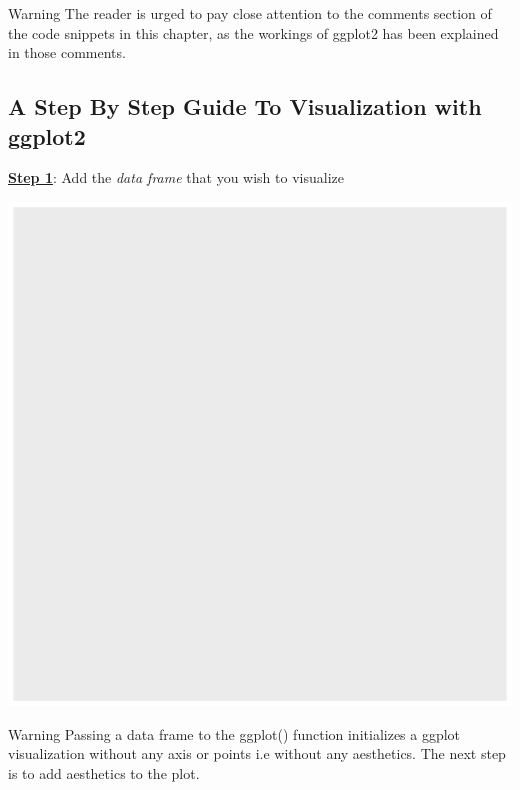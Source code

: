 \documentclass[12pt]{book}\usepackage{knitr}
\begin{document}
\begin{DIY}{Warning}
\noindent The reader is urged to pay close attention to the comments section of the code snippets in this chapter, as the workings of ggplot2 has been explained in those comments.
\end{DIY}



\newpage
\subsection{A Step By Step Guide To Visualization with ggplot2}
\noindent \textbf{\Large \underline{Step 1}}: {\Large Add the \emph{data frame} that you wish to visualize}
\begin{knitrout}
\color{fgcolor}\begin{kframe}
\begin{alltt}
 \hlkwb{<-} 
\end{alltt}
\end{kframe}
\includegraphics[width=\maxwidth]{figure/add_data_frame-1} 

\end{knitrout}

\begin{DIY}{Warning}
\noindent Passing a data frame to the ggplot() function initializes a ggplot visualization without any axis or points i.e without any aesthetics. The next step is to add aesthetics to the plot.
\end{DIY}
\end{document}
